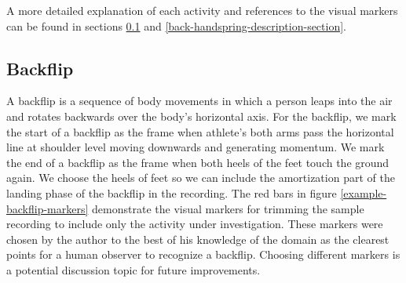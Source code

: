 A more detailed explanation of each activity and references to the visual markers can be found in sections \ref{backflip-description-section} and \ref{back-handspring-description-section}.

\subsection{Backflip}
\label{backflip-description-section}

A backflip is a sequence of body movements in which a person leaps into the air and rotates backwards over the body's horizontal axis. For the backflip, we mark the start of a backflip as the frame when athlete's both arms pass the horizontal line at shoulder level moving downwards and generating momentum. We mark the end of a backflip as the frame when both heels of the feet touch the ground again. We choose the heels of feet so we can include the amortization part of the landing phase of the backflip in the recording. The red bars in figure \ref{example-backflip-markers} demonstrate the visual markers for trimming the sample recording to include only the activity under investigation. These markers were chosen by the author to the best of his knowledge of the domain as the clearest points for a human observer to recognize a backflip. Choosing different markers is a potential discussion topic for future improvements.

